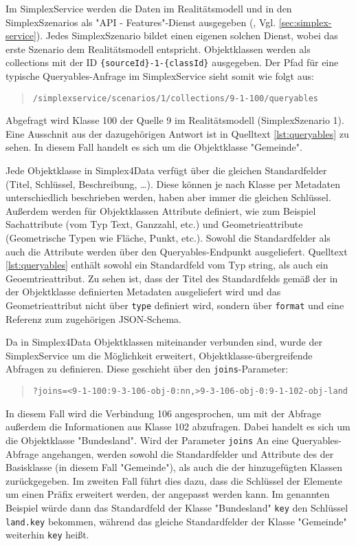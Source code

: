 Im SimplexService werden die Daten im Realitätsmodell und in den SimplexSzenarios als "API - Features"-Dienst ausgegeben (\textcite{grossmannEnvVisioService2022}, Vgl. \ref{sec:simplex-service}). Jedes SimplexSzenario bildet einen eigenen solchen Dienst, wobei das erste Szenario dem Realitätsmodell entspricht. Objektklassen werden als collections mit der ID \texttt{\{sourceId\}-1-\{classId\}} ausgegeben. Der Pfad für eine typische Queryables-Anfrage im SimplexService sieht somit wie folgt aus:
\begin{quote}
  \texttt{/simplexservice/scenarios/1/collections/9-1-100/queryables}
\end{quote}
Abgefragt wird Klasse 100 der Quelle 9 im Realitätsmodell (SimplexSzenario 1). Eine Ausschnit aus der dazugehörigen Antwort ist in Quelltext \ref{lst:queryables} zu sehen. In diesem Fall handelt es sich um die Objektklasse "Gemeinde".

Jede Objektklasse in Simplex4Data verfügt über die gleichen Standardfelder (Titel, Schlüssel, Beschreibung, \dots). Diese können je nach Klasse per Metadaten unterschiedlich beschrieben werden, haben aber immer die gleichen Schlüssel. Außerdem werden für Objektklassen Attribute definiert, wie zum Beispiel Sachattribute (vom Typ Text, Ganzzahl, etc.) und Geometrieattribute (Geometrische Typen wie Fläche, Punkt, etc.). Sowohl die Standardfelder als auch die Attribute werden über den Queryables-Endpunkt ausgeliefert. Quelltext \ref{lst:queryables} enthält sowohl ein Standardfeld vom Typ string, als auch ein Geoemtrieattribut. Zu sehen ist, dass der Titel des Standardfelds gemäß der in der Objektklasse definierten Metadaten ausgeliefert wird und das Geometrieattribut nicht über \texttt{type}  definiert wird, sondern über \texttt{format} und eine Referenz zum zugehörigen \ac{JSON}-Schema.

Da in Simplex4Data Objektklassen miteinander verbunden sind, wurde der SimplexService um die Möglichkeit erweitert, Objektklasse-übergreifende Abfragen zu definieren. Diese geschieht über den \texttt{joins}-Parameter:
\begin{quote}
  \texttt{?joins=<9-1-100:9-3-106-obj-0:nn,>9-3-106-obj-0:9-1-102-obj-land}
\end{quote}
In diesem Fall wird die Verbindung 106 angesprochen, um mit der Abfrage außerdem die Informationen aus Klasse 102 abzufragen. Dabei handelt es sich um die Objektklasse "Bundesland". Wird der Parameter \texttt{joins} An eine Queryables-Abfrage angehangen, werden sowohl die Standardfelder und Attribute des der Basisklasse (in diesem Fall "Gemeinde"), als auch die der hinzugefügten Klassen zurückgegeben. Im zweiten Fall führt dies dazu, dass die Schlüssel der Elemente um einen Präfix erweitert werden, der angepasst werden kann. Im genannten Beispiel würde dann das Standardfeld der Klasse "Bundesland" \texttt{key} den Schlüssel \texttt{land.key} bekommen, während das gleiche Standardfelder der Klasse "Gemeinde" weiterhin \texttt{key} heißt.
